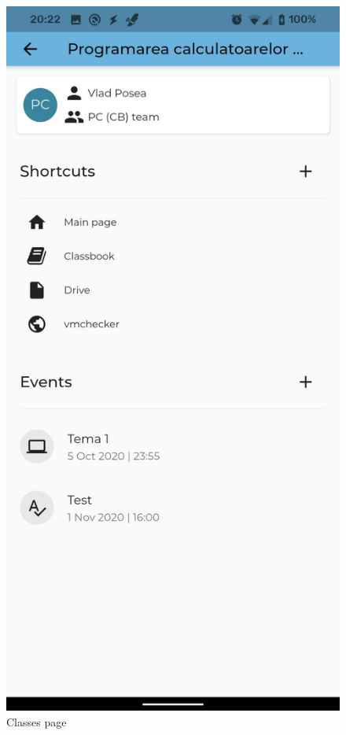 \begin{figure}[!ht]
\begin{minipage}[b]{0.26\textwidth}
        \caption{Classes page}
        \label{4:fig:classes}
    \end{minipage}
    \hfill
    \begin{minipage}[b]{0.26\textwidth}
        \captionsetup{justification=centering}
        \includegraphics[width=\textwidth]{figures/app/flutter/class.jpg}

\end{minipage}
\end{figure}
